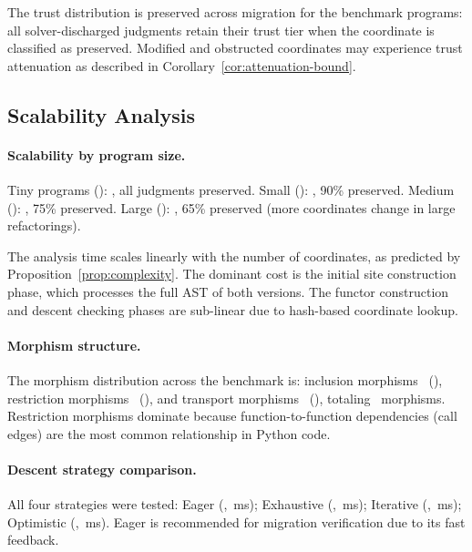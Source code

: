 \documentclass[11pt]{article}
\begin{document}
The trust distribution is preserved across migration for the benchmark
programs: all solver-discharged judgments retain their trust tier when the
coordinate is classified as preserved.  Modified and obstructed coordinates
may experience trust attenuation as described in
Corollary~\ref{cor:attenuation-bound}.

\subsection{Scalability Analysis}

\paragraph{Scalability by program size.}
Tiny programs (\compTinyCount): \compTinyMeanTime, all judgments preserved.
Small (\compSmallCount): \compSmallMeanTime, 90\% preserved.
Medium (\compMediumCount): \compMediumMeanTime, 75\% preserved.
Large (\compLargeCount): \compLargeMeanTime, 65\% preserved (more
coordinates change in large refactorings).

The analysis time scales linearly with the number of coordinates, as
predicted by Proposition~\ref{prop:complexity}.  The dominant cost is the
initial site construction phase, which processes the full AST of both
versions.  The functor construction and descent checking phases are
sub-linear due to hash-based coordinate lookup.

\paragraph{Morphism structure.}
The morphism distribution across the benchmark is: inclusion morphisms
\compMorphInclusion\ (\compMorphInclusionPct), restriction morphisms
\compMorphRestriction\ (\compMorphRestrictionPct), and transport morphisms
\compMorphTransport\ (\compMorphTransportPct), totaling \compMorphTotal\
morphisms.  Restriction morphisms dominate because function-to-function
dependencies (call edges) are the most common relationship in Python code.

\paragraph{Descent strategy comparison.}
All four strategies were tested: Eager (\compDescentEagerRate,
\compDescentEagerMeanMs\,ms); Exhaustive (\compDescentExhaustiveRate,
\compDescentExhaustiveMeanMs\,ms); Iterative (\compDescentIterativeRate,
\compDescentIterativeMeanMs\,ms); Optimistic (\compDescentOptimisticRate,
\compDescentOptimisticMeanMs\,ms).  Eager is recommended for migration
verification due to its fast feedback.
\end{document}

